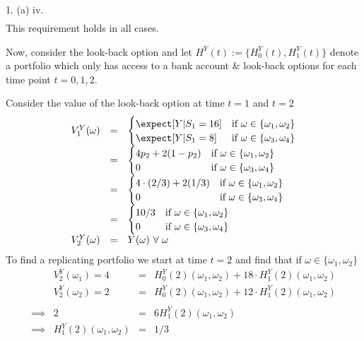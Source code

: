 \documentclass[11pt,a4paper]{article}
\begin{document}
\begin{answer}{1. (a) iv.}
\[\begin{array}{r|rclcl}
  \end{array}\]
  This requirement holds in all cases.
  \vspace{5mm}
  \par Now, consider the look-back option and let $H^Y(t):=\{H_0^Y(t),H_1^Y(t)\}$ denote a portfolio which only has access to a bank account \& look-back options for each time point $t=0,1,2$.
  \par Consider the value of the look-back option at time $t=1$ and $t=2$
  \[\begin{array}{rcl}
    V_1^Y(\omega)&=&\begin{cases}
      \expect[Y|S_1=16]&\text{if }\omega\in\{\omega_1,\omega_2\}\\
      \expect[Y|S_1=8]&\text{if }\omega\in\{\omega_3,\omega_4\}
    \end{cases}\\
    &=&\begin{cases}
      4p_2+2(1-p_2)&\text{if }\omega\in\{\omega_1,\omega_2\}\\
      0&\text{if }\omega\in\{\omega_3,\omega_4\}
    \end{cases}\\
    &=&\begin{cases}
      4\cdot(2/3)+2(1/3)&\text{if }\omega\in\{\omega_1,\omega_2\}\\
      0&\text{if }\omega\in\{\omega_3,\omega_4\}
    \end{cases}\\
    &=&\begin{cases}
      10/3&\text{if }\omega\in\{\omega_1,\omega_2\}\\
      0&\text{if }\omega\in\{\omega_3,\omega_4\}
    \end{cases}\\
    V_2^Y(\omega)&=&Y(\omega)\ \forall\ \omega
  \end{array}\]
  To find a replicating portfolio we start at time $t=2$ and find that if $\omega\in\{\omega_1,\omega_2\}$
  \[\begin{array}{rrcl}
    &V_2^Y(\omega_1)=4&=&H_0^Y(2)(\omega_1,\omega_2)+18\cdot H_1^Y(2)(\omega_1,\omega_2)\\
    &V_2^Y(\omega_2)=2&=&H_0^Y(2)(\omega_1,\omega_2)+12\cdot H_1^Y(2)(\omega_1,\omega_2)\\\\
    \implies&2&=&6H_1^Y(2)(\omega_1,\omega_2)\\
    \implies&H_1^Y(2)(\omega_1,\omega_2)&=&1/3\\\\

\end{array}\]
\end{answer}
\end{document}
